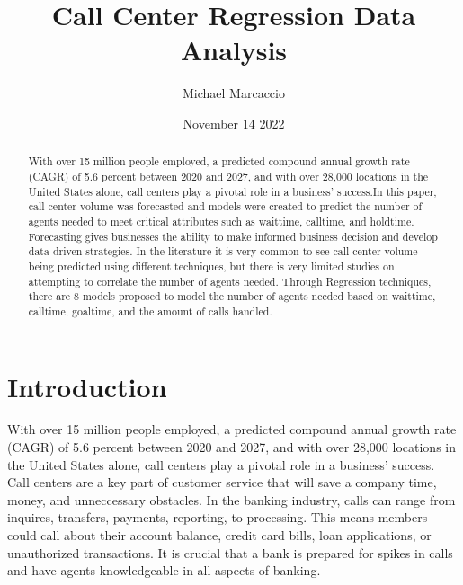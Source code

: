 \documentclass[12pt]{article}
\title{Call Center Regression Data Analysis}
\author{Michael  Marcaccio}
\date{November 14 2022}
\begin{document}
\maketitle

\begin{abstract}
 With over 15 million people employed, a predicted compound annual growth rate (CAGR) of 5.6 percent between 2020 and 2027, and with over 28,000 locations
 in the United States alone, call centers play a pivotal role in a business' success.In this paper, call center volume was forecasted and
 models were created to predict the number of agents needed to meet critical attributes such as waittime, calltime, and holdtime. 
 Forecasting gives businesses the ability to make informed business decision and develop data-driven strategies. In the literature it is very
 common to see call center volume being predicted using different techniques, but there is very limited studies on attempting to correlate
 the number of agents needed. Through Regression techniques, there are 8 models proposed to model the number of agents needed based on waittime,
 calltime, goaltime, and the amount of calls handled.
\end{abstract}

\section*{Introduction}
  With over 15 million people employed, a predicted compound annual growth rate (CAGR) of 5.6 percent between 2020 and 2027, and with over 28,000 locations
in the United States alone, call centers play a pivotal role in a business' success. Call centers are a key part of customer service
that will save a company time, money, and unneccessary obstacles. In the banking industry, calls can range from inquires, transfers, 
payments, reporting, to processing. This means members could call about their account balance, credit card bills, loan applications, 
or unauthorized transactions. It is crucial that a bank is prepared for spikes in calls and have agents knowledgeable in all aspects of banking.
\end{document}
